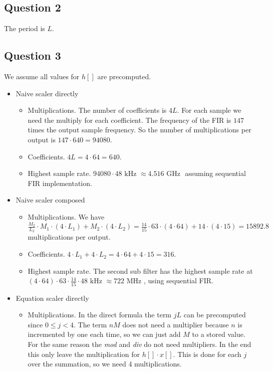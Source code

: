 \subsection{Question 2}
The period is $L$.

\subsection{Question 3}
We assume all values for $h[]$ are precomputed.
\begin{itemize}
\item Naive scaler directly
\begin{itemize}
\item Multiplications. The number of coefficients is $4L$. For each sample we need the multiply for each coefficient. The frequency of the FIR is $147$ times the output sample frequency. So the number of multiplications per output is $147 \cdot 640 = 94080$.
\item Coefficients. $4L = 4 \cdot 64 = 640$.
\item Highest sample rate. $94080 \cdot 48 \text{ kHz } \approx 4.516  \text{ GHz }$ assuming sequential FIR implementation.
\end{itemize}
\item Naive scaler composed
\begin{itemize}
\item Multiplications. We have $\frac{M_2}{L_2} \cdot M_1 \cdot (4 \cdot L_1) + M_2 \cdot (4 \cdot L_2) = \frac{14}{15} \cdot 63 \cdot (4 \cdot 64) + 14 \cdot (4 \cdot 15) = 15892.8$ multiplications per output. 
\item Coefficients. $4 \cdot L_1 + 4 \cdot L_2 = 4 \cdot 64 + 4\cdot 15 = 316$.
\item Highest sample rate. The second sub filter has the highest sample rate at $(4 \cdot 64) \cdot 63 \cdot \frac{14}{15} \cdot 48 \text{ kHz } \approx 722\text{ MHz }$, using sequential FIR.
\end{itemize}
\item Equation scaler directly
\begin{itemize}
\item Multiplications. In the direct formula the term $jL$ can be precomputed since $0\leq j<4$. The term $nM$ does not need a multiplier because $n$ is incremented by one each time, so we can just add $M$ to a stored value. For the same reason the \emph{mod} and \emph{div} do not need multipliers. In the end this only leave the multiplication for $h[]\cdot x[]$. This is done for each $j$ over the summation, so we need 4 multiplications. 

\end{itemize}
\end{itemize}
